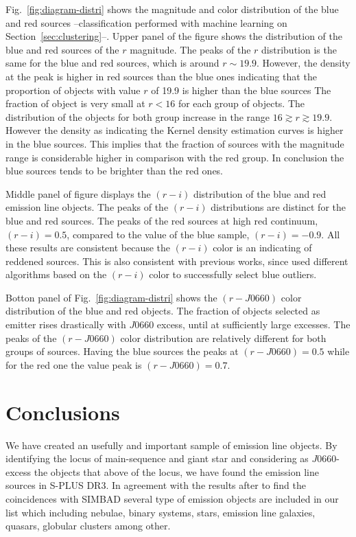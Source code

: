 \documentclass[fleqn,usenatbib]{mnras}
\begin{document}
{Fig.~\ref{fig:diagram-distri} shows the magnitude and color distribution of the blue and red
sources --classification performed with machine learning on Section~\ref{sec:clustering}--.
Upper panel of the figure shows the distribution of the blue and red sources of the $r$ magnitude.
The peaks of the $r$ distribution is the same for the blue and red sources, which is around
$r \sim 19.9$. However, the density at the peak is higher in red sources than the blue ones
indicating that the proportion of objects with value $r$ of 19.9 is higher than the blue sources
The fraction of object is very small at $r < 16$ for each group of objects.
The distribution of the objects for both group increase in the range $16 \gtrsim r \gtrsim 19.9$.
However the density as indicating the Kernel density estimation curves is higher in the
blue sources. This implies that the fraction of sources with the magnitude range is considerable
higher in comparison with the red group. In conclusion the blue sources tends to be brighter
than the red ones.


Middle panel of figure displays the $(r - i)$ distribution of the blue and red emission line
objects. The peaks of the $(r - i)$ distributions are distinct for the blue and red sources.
The peaks of the red sources at high red continuum,  $(r - i) = 0.5$, compared to the value
of the blue sample, $(r - i) = -0.9$. All these results are consistent because the $(r - i)$
color is an indicating of reddened sources. This is also consistent with previous works,
since \citet{Wevers:2017} used different algorithms based on the  $(r - i)$ color
to successfully select blue outliers.

Botton panel of Fig.~\ref{fig:diagram-distri} shows the
$(r - J0660)$ color distribution of the blue and red objects.  The fraction of objects selected
as emitter rises drastically with $J$0660 excess, until at sufficiently large excesses. The peaks
of the $(r - J0660)$ color distribution are relatively different for both groups of sources.
Having the blue sources the peaks at  $(r - J0660) = 0.5$ while for the red one the value peak
is $(r - J0660)=0.7$.


\section{Conclusions}

We have created an usefully and important sample of emission line objects.
By identifying the locus of main-sequence and giant star and considering as
$J0660$-excess the objects that above of the locus, we have found
the emission line sources in S-PLUS DR3. In agreement with the results after
to find the coincidences with SIMBAD several type of emission objects are included
in our list which including nebulae, binary systems, stars, emission line galaxies,
quasars, globular clusters among other.

}
\end{document}
